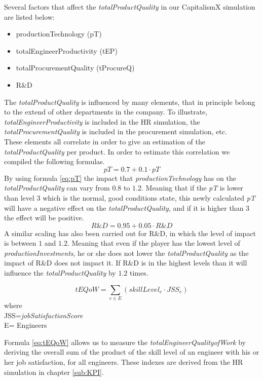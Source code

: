  Several factors that affect the \textit{totalProductQuality} in our CapitalismX simulation are listed below:
\begin{itemize}
\item productionTechnology (\gls{pT})
\item totalEngineerProductivity (\gls{tEP}) 
\item totalProcurementQuality (tProcureQ)
\item R\&D
\end{itemize}
The \textit{totalProductQuality} is influenced by many elements, that in principle belong to the extend of other departments in the company. To illustrate, \textit{totalEngineerProductivity} is included in the HR simulation, the \textit{totalProcurementQuality} is included in the procurement simulation, etc. \\
These elements all correlate in order to give an estimation of the \textit{totalProductQuality} per product. In order to estimate this correlation we compiled the following formulas.
 \begin{equation}
pT=0.7+0.1 \cdot pT
 \label{eq:pT}
 \end{equation}
By using formula \ref{eq:pT} the impact that \textit{productionTechnology} has on the \textit{totalProductQuality} can vary from $0.8$ to $1.2$. Meaning that if the \textit{pT} is lower than level $3$ which is the normal, good conditions state, this newly calculated \textit{pT} will have a negative effect on the \textit{totalProductQuality}, and if it is higher than $3$ the effect will be positive.
\begin{equation}
R\&D= 0.95 + 0.05 \cdot R\&D
\label{eq:R\&D}
\end{equation}
A similar scaling has also been carried out for R\&D, in which the level of impact is between $1$ and $1.2$. Meaning that even if the player has the lowest level of \textit{productionInvestments}, he or she does not lower the \textit{totalProductQuality} as the impact of R\&D does not impact it. If R\&D is in the highest levels than it will influence the \textit{totalProductQuality} by $1.2$ times.
\begin{center}
\begin{equation}
tEQoW=\sum_{e \in E}{(skillLevel_e \cdot JSS_e)}
\label{eq:tEQoW}
\end{equation}
where \\
JSS=\textit{jobSatisfactionScore}\\
E= Engineers
\end{center}
Formula \ref{eq:tEQoW} allows us to measure the \textit{totalEngineerQualityofWork} by deriving the overall sum of the product of the skill level of an engineer with his or her job satisfaction, for all engineers. These indexes are derived from the HR simulation in chapter \ref{sub:KPI}.
